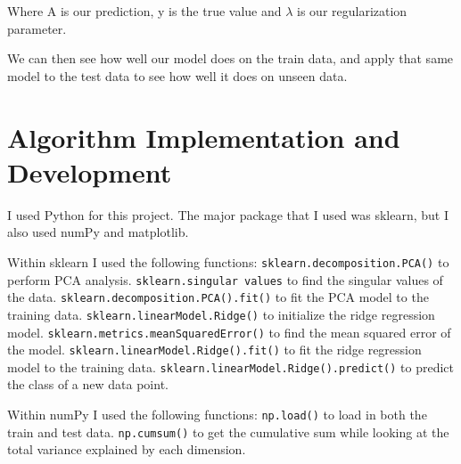 \documentclass[11pt]{amsart}
\begin{document}
Where A is our prediction, y is the true value and $\lambda$ is our regularization parameter. 

We can then see how well our model does on the train data, and apply that same model to the test data to see how well it 
does on unseen data. 

\section{Algorithm Implementation and Development}\label{sec:algorithms}
I used Python for this project. The major package that I used was sklearn, but I also used numPy and matplotlib. 

Within sklearn I used the following functions:
\subitem \texttt{sklearn.decomposition.PCA()} to perform PCA analysis.
\subitem \texttt{sklearn.singular values} to find the singular values of the data.
\subitem \texttt{sklearn.decomposition.PCA().fit()} to fit the PCA model to the training data.
\subitem \texttt{sklearn.linearModel.Ridge()} to initialize the ridge regression model.
\subitem \texttt{sklearn.metrics.meanSquaredError()} to find the mean squared error of the model.
\subitem \texttt{sklearn.linearModel.Ridge().fit()} to fit the ridge regression model to the training data.
\subitem \texttt{sklearn.linearModel.Ridge().predict()} to predict the class of a new data point.

Within numPy I used the following functions:
\subitem \texttt{np.load()} to load in both the train and test data.
\subitem \texttt{np.cumsum()} to get the cumulative sum while looking at the total variance explained by each dimension.
\end{document}
